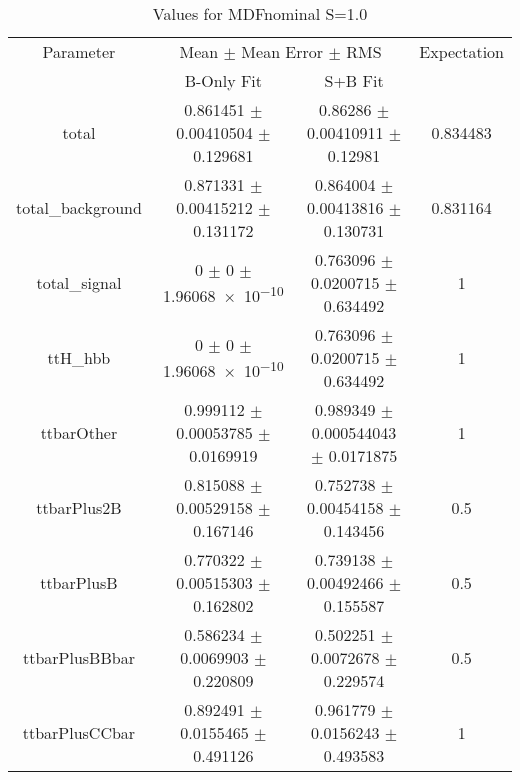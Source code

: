 \begin{table}
\centering
\caption{Values for MDFnominal S=1.0}
\begin{tabular}{cccc}
\toprule
Parameter & \multicolumn{2}{c}{Mean $\pm$ Mean Error $\pm$ RMS} & Expectation\\
 & B-Only Fit & S+B Fit & \\
\midrule
total & \num{0.861451} $\pm$ \num{0.00410504} $\pm$ \num{0.129681} & \num{0.86286} $\pm$ \num{0.00410911} $\pm$ \num{0.12981} & \num{0.834483}\\
total\_background & \num{0.871331} $\pm$ \num{0.00415212} $\pm$ \num{0.131172} & \num{0.864004} $\pm$ \num{0.00413816} $\pm$ \num{0.130731} & \num{0.831164}\\
total\_signal & \num{0} $\pm$ \num{0} $\pm$ \num{1.96068e-10} & \num{0.763096} $\pm$ \num{0.0200715} $\pm$ \num{0.634492} & \num{1}\\
ttH\_hbb & \num{0} $\pm$ \num{0} $\pm$ \num{1.96068e-10} & \num{0.763096} $\pm$ \num{0.0200715} $\pm$ \num{0.634492} & \num{1}\\
ttbarOther & \num{0.999112} $\pm$ \num{0.00053785} $\pm$ \num{0.0169919} & \num{0.989349} $\pm$ \num{0.000544043} $\pm$ \num{0.0171875} & \num{1}\\
ttbarPlus2B & \num{0.815088} $\pm$ \num{0.00529158} $\pm$ \num{0.167146} & \num{0.752738} $\pm$ \num{0.00454158} $\pm$ \num{0.143456} & \num{0.5}\\
ttbarPlusB & \num{0.770322} $\pm$ \num{0.00515303} $\pm$ \num{0.162802} & \num{0.739138} $\pm$ \num{0.00492466} $\pm$ \num{0.155587} & \num{0.5}\\
ttbarPlusBBbar & \num{0.586234} $\pm$ \num{0.0069903} $\pm$ \num{0.220809} & \num{0.502251} $\pm$ \num{0.0072678} $\pm$ \num{0.229574} & \num{0.5}\\
ttbarPlusCCbar & \num{0.892491} $\pm$ \num{0.0155465} $\pm$ \num{0.491126} & \num{0.961779} $\pm$ \num{0.0156243} $\pm$ \num{0.493583} & \num{1}\\
\bottomrule
\end{tabular}
\end{table}